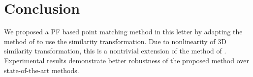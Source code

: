 \documentclass[11pt,bezier,]{article}
\begin{document}
\section{Conclusion}
We proposed a PF based point matching method in this letter
by adapting the method of \cite{RPM_PF_aff} to use the similarity transformation.
Due to nonlinearity of 3D similarity transformation,
this is a nontrivial extension of the method of \cite{RPM_PF_aff}.
Experimental results demonstrate better robustness of the proposed method %
over  state-of-the-art methods.


% 






% 
% 
\end{document}
